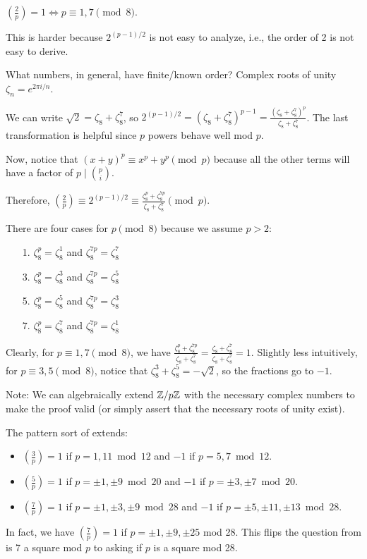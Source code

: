 \documentclass[notes]{agony}
\begin{document}
\begin{lemma}
  $(\frac{2}{p}) = 1 \iff p \equiv 1,7 \pmod 8$.
\end{lemma}
\begin{prf}
  This is harder because $2^{(p-1)/2}$ is not easy to analyze, i.e.,
  the order of 2 is not easy to derive.

  What numbers, in general, have finite/known order?
  Complex roots of unity $\zeta_n = e^{2\pi i/n}$.

  We can write $\sqrt{2} = \zeta_8 + \zeta_8^7$,
  so $2^{(p-1)/2} = (\zeta_8 + \zeta_8^7)^{p-1}
    = \frac{(\zeta_8 + \zeta_8^7)^p}{\zeta_8 + \zeta_8^7}$.
  The last transformation is helpful since $p$ powers behave well mod $p$.

  Now, notice that $(x+y)^p \equiv x^p + y^p \pmod p$
  because all the other terms will have a factor of $p \mid \binom{p}{i}$.

  Therefore, $(\frac{2}{p}) \equiv 2^{(p-1)/2} \equiv \frac{\zeta_8^p + \zeta_8^{7p}}{\zeta_8+\zeta_8^7} \pmod p$.

  There are four cases for $p \pmod 8$ because we assume $p > 2$:
  \begin{enumerate}[nosep]
    \item[1.] $\zeta_8^p = \zeta_8^1$ and $\zeta_8^{7p} = \zeta_8^7$
    \item[3.] $\zeta_8^p = \zeta_8^3$ and $\zeta_8^{7p} = \zeta_8^5$
    \item[5.] $\zeta_8^p = \zeta_8^5$ and $\zeta_8^{7p} = \zeta_8^3$
    \item[7.] $\zeta_8^p = \zeta_8^7$ and $\zeta_8^{7p} = \zeta_8^1$
  \end{enumerate}
  Clearly, for $p \equiv 1,7 \pmod 8$, we have
  $\frac{\zeta_8^p + \zeta_8^{7p}}{\zeta_8 + \zeta_8^7}
    = \frac{\zeta_8 + \zeta_8^7}{\zeta_8 + \zeta_8^7} = 1$.
  Slightly less intuitively, for $p \equiv 3,5 \pmod 8$,
  notice that $\zeta_8^3 + \zeta_8^5 = -\sqrt{2}$,
  so the fractions go to $-1$.
\end{prf}

Note: We can algebraically extend $\mathbb{Z}/p\mathbb{Z}$ with the necessary complex numbers
to make the proof valid (or simply assert that the necessary roots of unity exist).

The pattern sort of extends:
\begin{itemize}[nosep]
  \item $(\frac{3}{p}) = 1$ if $p = 1,11 \bmod 12$ and $-1$ if $p = 5,7 \bmod 12$.
  \item $(\frac{5}{p}) = 1$ if $p = \pm 1,\pm 9 \bmod 20$ and $-1$ if $p = \pm 3,\pm 7 \bmod 20$.
  \item $(\frac{7}{p}) = 1$ if $p = \pm 1,\pm 3, \pm 9 \bmod 28$ and $-1$ if $p = \pm 5,\pm 11, \pm 13 \bmod 28$.
\end{itemize}
In fact, we have $(\frac{7}{p}) = 1$ if $p = \pm 1, \pm 9, \pm 25$ mod 28.
This flips the question from is 7 a square mod $p$ to asking if $p$ is a square mod 28.
\end{document}
